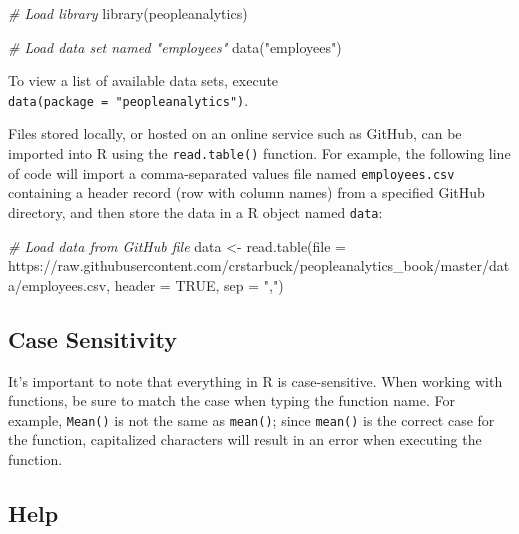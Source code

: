 \documentclass[
]{book}
\newenvironment{Shaded}{\begin{snugshade}}{\end{snugshade}}
\newcommand{\AttributeTok}[1]{\textcolor[rgb]{0.77,0.63,0.00}{#1}}
\newcommand{\CommentTok}[1]{\textcolor[rgb]{0.56,0.35,0.01}{\textit{#1}}}
\newcommand{\ConstantTok}[1]{\textcolor[rgb]{0.00,0.00,0.00}{#1}}
\newcommand{\FunctionTok}[1]{\textcolor[rgb]{0.00,0.00,0.00}{#1}}
\newcommand{\NormalTok}[1]{#1}
\newcommand{\OtherTok}[1]{\textcolor[rgb]{0.56,0.35,0.01}{#1}}
\newcommand{\StringTok}[1]{\textcolor[rgb]{0.31,0.60,0.02}{#1}}
\begin{document}
\begin{Shaded}
\begin{Highlighting}[]
\CommentTok{\# Load library}
\FunctionTok{library}\NormalTok{(peopleanalytics)}

\CommentTok{\# Load data set named "employees"}
\FunctionTok{data}\NormalTok{(}\StringTok{"employees"}\NormalTok{)}
\end{Highlighting}
\end{Shaded}

To view a list of available data sets, execute \texttt{data(package\ =\ "peopleanalytics")}.

Files stored locally, or hosted on an online service such as GitHub, can be imported into R using the \texttt{read.table()} function. For example, the following line of code will import a comma-separated values file named \texttt{employees.csv} containing a header record (row with column names) from a specified GitHub directory, and then store the data in a R object named \texttt{data}:

\begin{Shaded}
\begin{Highlighting}[]
\CommentTok{\# Load data from GitHub file}
\NormalTok{data }\OtherTok{\textless{}{-}} \FunctionTok{read.table}\NormalTok{(}\AttributeTok{file =} \StringTok{\textquotesingle{}https://raw.githubusercontent.com/crstarbuck/peopleanalytics\_book/master/data/employees.csv\textquotesingle{}}\NormalTok{, }\AttributeTok{header =} \ConstantTok{TRUE}\NormalTok{, }\AttributeTok{sep =} \StringTok{","}\NormalTok{)}
\end{Highlighting}
\end{Shaded}

\hypertarget{case-sensitivity}{%
\subsection{Case Sensitivity}\label{case-sensitivity}}

It's important to note that everything in R is case-sensitive. When working with functions, be sure to match the case when typing the function name. For example, \texttt{Mean()} is not the same as \texttt{mean()}; since \texttt{mean()} is the correct case for the function, capitalized characters will result in an error when executing the function.

\hypertarget{help}{%
\subsection{Help}\label{help}}
\end{document}
